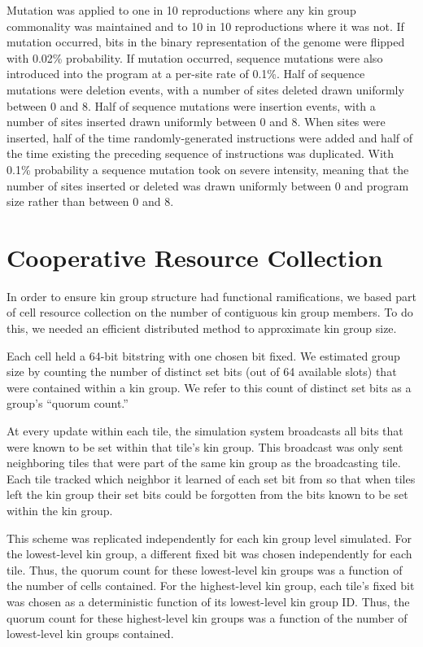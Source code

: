 Mutation was applied to one in 10 reproductions where any kin group commonality was maintained and to 10 in 10 reproductions where it was not.
If mutation occurred, bits in the binary representation of the genome were flipped with 0.02\% probability.
If mutation occurred, sequence mutations were also introduced into the program at a per-site rate of 0.1\%.
Half of sequence mutations were deletion events, with a number of sites deleted drawn uniformly between 0 and 8.
Half of sequence mutations were insertion events, with a number of sites inserted drawn uniformly between 0 and 8.
When sites were inserted, half of the time randomly-generated instructions were added and half of the time existing the preceding sequence of instructions was duplicated.
With 0.1\% probability a sequence mutation took on severe intensity, meaning that the number of sites inserted or deleted was drawn uniformly between 0 and program size rather than between 0 and 8.

\section{Cooperative Resource Collection}

In order to ensure kin group structure had functional ramifications, we based part of cell resource collection on the number of contiguous kin group members.
To do this, we needed an efficient distributed method to approximate kin group size.

Each cell held a 64-bit bitstring with one chosen bit fixed.
We estimated group size by counting the number of distinct set bits (out of 64 available slots) that were contained within a kin group.
We refer to this count of distinct set bits as a group's ``quorum count.''

At every update within each tile, the simulation system broadcasts all bits that were known to be set within that tile's kin group.
This broadcast was only sent neighboring tiles that were part of the same kin group as the broadcasting tile.
Each tile tracked which neighbor it learned of each set bit from so that when tiles left the kin group their set bits could be forgotten from the bits known to be set within the kin group.

This scheme was replicated independently for each kin group level simulated.
For the lowest-level kin group, a different fixed bit was chosen independently for each tile.
Thus, the quorum count for these lowest-level kin groups was a function of the number of cells contained.
For the highest-level kin group, each tile's fixed bit was chosen as a deterministic function of its lowest-level kin group ID.
Thus, the quorum count for these highest-level kin groups was a function of the number of lowest-level kin groups contained.

